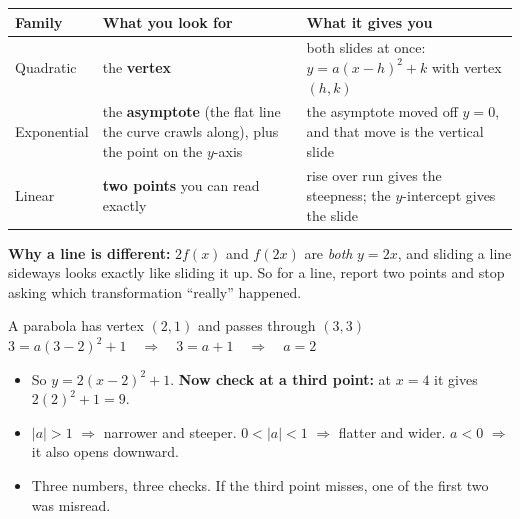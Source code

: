 \documentclass[aspectratio=169, 11pt]{beamer}
\begin{document}
\begin{frame}[t, plain]
  \renewcommand{\arraystretch}{1.3}
  \small
  \begin{tabularx}{\textwidth}{@{}p{2.1cm} p{5.2cm} X@{}}
    \textbf{Family} & \textbf{What you look for} & \textbf{What it gives you} \\
    \hline
    Quadratic & the \textbf{vertex} & both slides at once: $y=a(x-h)^2+k$ with vertex $(h,k)$ \\
    Exponential & the \textbf{asymptote} (the flat line the curve crawls along), plus the point on
      the $y$-axis & the asymptote moved off $y=0$, and that move is the vertical slide \\
    Linear & \textbf{two points} you can read exactly & rise over run gives the steepness; the
      $y$-intercept gives the slide \\
  \end{tabularx}
  \vspace{0.25cm}

  \textbf{Why a line is different:} $2f(x)$ and $f(2x)$ are \emph{both} $y=2x$, and sliding a line
  sideways looks exactly like sliding it up. So for a line, report two points and stop asking which
  transformation ``really'' happened.
\end{frame}

\begin{frame}[t, plain]
  \begin{block}{A parabola has vertex $(2,1)$ and passes through $(3,3)$}
    \centering\large
    $3 = a(3-2)^2+1 \quad\Longrightarrow\quad 3 = a+1 \quad\Longrightarrow\quad a=2$
  \end{block}
  \begin{itemize}
    \setlength{\itemsep}{0.28cm}
    \item So $y=2(x-2)^2+1$. \textbf{Now check at a third point:} at $x=4$ it gives
          $2(2)^2+1=9$.
    \item $|a|>1$ $\Rightarrow$ narrower and steeper. \quad $0<|a|<1$ $\Rightarrow$ flatter and
          wider. \quad $a<0$ $\Rightarrow$ it also opens downward.
    \item Three numbers, three checks. If the third point misses, one of the first two was misread.
  \end{itemize}
\end{frame}
\end{document}
